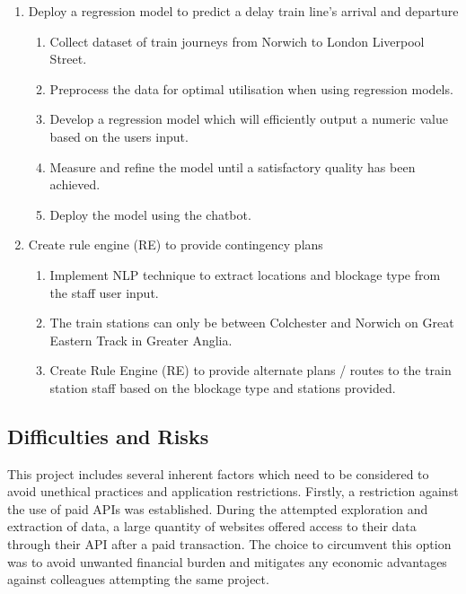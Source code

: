 \begin{enumerate}
    \item Deploy a regression model to predict a delay train line's arrival and departure
        \begin{enumerate}
            \item Collect dataset of train journeys from Norwich to London Liverpool Street.
            \item Preprocess the data for optimal utilisation when using regression models.
            \item Develop a regression model which will efficiently output a numeric value based on the users input.
            \item Measure and refine the model until a satisfactory quality has been achieved.
            \item Deploy the model using the chatbot.
        \end{enumerate}

    \item Create rule engine (RE) to provide contingency plans
        \begin{enumerate}
            \item Implement NLP technique to extract locations and blockage type from the staff user input. 
            \item The train stations can only be between Colchester and Norwich on Great Eastern Track in Greater Anglia.
            \item Create Rule Engine (RE) to provide alternate plans / routes to the train station staff based on the blockage type and stations provided.
        \end{enumerate}
\end{enumerate}

\subsection{Difficulties and Risks}
This project includes several inherent factors which need to be considered to avoid unethical practices and application restrictions. Firstly, a restriction against the use of paid APIs was established. During the attempted exploration and extraction of data, a large quantity of websites offered access to their data through their API after a paid transaction. The choice to circumvent this option was to avoid unwanted financial burden and mitigates any economic advantages against colleagues attempting the same project.\vspace{0.5cm}

